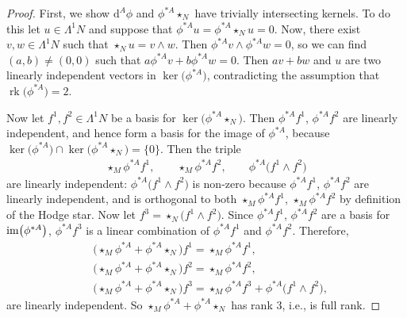 \documentclass[10pt,a4paper]{amsart}
\newcommand{\1}{{\mathbb{1}}}
\def \d{\mathrm{d}}
\newcommand{\rk}{{\operatorname{rk}}}
\numberwithin{equation}{section}
\begin{document}
\begin{proof}
First, we show $\d^A\phi$ and $\phi^{\ast A}\star_{N}$ have trivially intersecting kernels. To do this let $u\in\Lambda^1N$ and suppose that $\phi^{\ast A}u=\phi^{\ast A}\star_{N}u=0$. Now, there exist $v,w\in\Lambda^1N$ such that $\star_{N}u=v\wedge w$. Then $\phi^{\ast A}v\wedge\phi^{\ast A}w=0$, so we can find $(a,b)\neq(0,0)$ such that $a\phi^{\ast A}v+b\phi^{\ast A}w=0$. Then $av+bw$ and $u$ are two linearly independent vectors in $\ker\big(\phi^{\ast A}\big)$, contradicting the assumption that $\rk\big(\phi^{\ast A}\big)=2$.

Now let $f^1,f^2\in\Lambda^1N$ be a basis for $\ker\big(\phi^{\ast A}\star_N\big)$. Then $\phi^{\ast A}f^1$, $\phi^{\ast A}f^2$ are linearly independent, and hence form a basis for the image of $\phi^{\ast A}$, because $\ker\big(\phi^{\ast A}\big)\cap\ker\big(\phi^{\ast A}\star_N\big)=\{0\}$. Then the triple
\begin{align*}
\star_{M}\phi^{\ast A}f^1,\qquad\star_{M}\phi^{\ast A}f^2,\qquad\phi^{\ast A}\big(f^1\wedge f^2\big)
\end{align*}
are linearly independent: $\phi^{\ast A}\big(f^1\wedge f^2\big)$ is non-zero because $\phi^{\ast A}f^1$, $\phi^{\ast A}f^2$ are linearly independent, and is orthogonal to both $\star_{M}\phi^{\ast A}f^1$, $\star_{M}\phi^{\ast A}f^2$ by definition of the Hodge star. Now let $f^3=\star_{N}\big(f^1\wedge f^2\big)$. Since $\phi^{\ast A}f^1$, $\phi^{\ast A}f^2$ are a basis for ${\rm im}\big(\phi^{\ast A}\big)$, $\phi^{\ast A}f^3$ is a linear combination of $\phi^{\ast A}f^1$ and $\phi^{\ast A}f^2$. Therefore,
\begin{align*}
& \bigl(\star_{M}\phi^{\ast A}+\phi^{\ast A}\star_{N}\bigr)f^1=\star_{M}\phi^{\ast A}f^1,\\
& \bigl(\star_{M}\phi^{\ast A}+\phi^{\ast A}\star_{N}\bigr)f^2=\star_{M}\phi^{\ast A}f^2,\\
& \bigl(\star_{M}\phi^{\ast A}+\phi^{\ast A}\star_{N}\bigr)f^3=\star_{M}\phi^{\ast A}f^3+\phi^{\ast A}\big(f^1\wedge f^2\big),
\end{align*}
are linearly independent. So $\star_{M}\phi^{\ast A}+\phi^{\ast A}\star_{N}$ has rank $3$, i.e., is full rank.
\end{proof}
\end{document}
